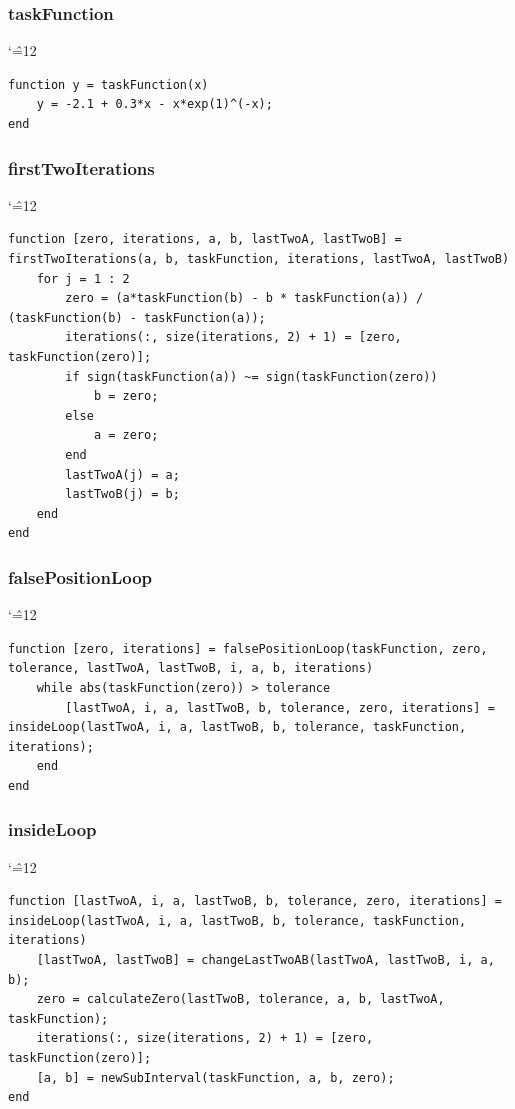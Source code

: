 \documentclass[12pt]{report}
\newenvironment{simplechar}{%
   \catcode`\^=12
}{}
\begin{document}
\subsubsection{taskFunction}
\begin{simplechar}
\begin{lstlisting}
function y = taskFunction(x)
    y = -2.1 + 0.3*x - x*exp(1)^(-x);
end
\end{lstlisting}
\end{simplechar}

\newpage
\subsubsection{firstTwoIterations}
\begin{simplechar}
\begin{lstlisting}
function [zero, iterations, a, b, lastTwoA, lastTwoB] = firstTwoIterations(a, b, taskFunction, iterations, lastTwoA, lastTwoB)
    for j = 1 : 2
        zero = (a*taskFunction(b) - b * taskFunction(a)) / (taskFunction(b) - taskFunction(a));
        iterations(:, size(iterations, 2) + 1) = [zero, taskFunction(zero)];
        if sign(taskFunction(a)) ~= sign(taskFunction(zero))
            b = zero;
        else
            a = zero;
        end
        lastTwoA(j) = a;
        lastTwoB(j) = b;
    end
end
\end{lstlisting}
\end{simplechar}

\subsubsection{falsePositionLoop}
\begin{simplechar}
\begin{lstlisting}
function [zero, iterations] = falsePositionLoop(taskFunction, zero, tolerance, lastTwoA, lastTwoB, i, a, b, iterations)
    while abs(taskFunction(zero)) > tolerance
        [lastTwoA, i, a, lastTwoB, b, tolerance, zero, iterations] = insideLoop(lastTwoA, i, a, lastTwoB, b, tolerance, taskFunction, iterations);
    end
end
\end{lstlisting}
\end{simplechar}

\newpage
\subsubsection{insideLoop}
\begin{simplechar}
\begin{lstlisting}
function [lastTwoA, i, a, lastTwoB, b, tolerance, zero, iterations] = insideLoop(lastTwoA, i, a, lastTwoB, b, tolerance, taskFunction, iterations)
    [lastTwoA, lastTwoB] = changeLastTwoAB(lastTwoA, lastTwoB, i, a, b);
    zero = calculateZero(lastTwoB, tolerance, a, b, lastTwoA, taskFunction);
    iterations(:, size(iterations, 2) + 1) = [zero, taskFunction(zero)];
    [a, b] = newSubInterval(taskFunction, a, b, zero);
end
\end{lstlisting}
\end{simplechar}
\end{document}
